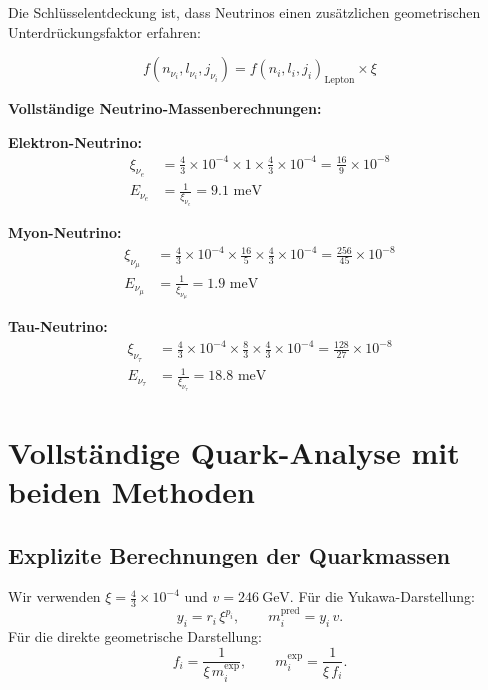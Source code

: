 	Die Schlüsselentdeckung ist, dass Neutrinos einen zusätzlichen geometrischen Unterdrückungsfaktor erfahren:
	
	\begin{equation}
		f(n_{\nu_i}, l_{\nu_i}, j_{\nu_i}) = f(n_i, l_i, j_i)_{\text{Lepton}} \times \xi
		\label{eq:neutrino_suppression}
	\end{equation}
	
	\textbf{Vollständige Neutrino-Massenberechnungen:}
	
	\textbf{Elektron-Neutrino:}
	\begin{align}
		\xi_{\nu_e} &= \frac{4}{3} \times 10^{-4} \times 1 \times \frac{4}{3} \times 10^{-4} = \frac{16}{9} \times 10^{-8} \\
		E_{\nu_e} &= \frac{1}{\xi_{\nu_e}} = 9.1 \text{ meV}
	\end{align}
	
	\textbf{Myon-Neutrino:}
	\begin{align}
		\xi_{\nu_\mu} &= \frac{4}{3} \times 10^{-4} \times \frac{16}{5} \times \frac{4}{3} \times 10^{-4} = \frac{256}{45} \times 10^{-8} \\
		E_{\nu_\mu} &= \frac{1}{\xi_{\nu_\mu}} = 1.9 \text{ meV}
	\end{align}
	
	\textbf{Tau-Neutrino:}
	\begin{align}
		\xi_{\nu_\tau} &= \frac{4}{3} \times 10^{-4} \times \frac{8}{3} \times \frac{4}{3} \times 10^{-4} = \frac{128}{27} \times 10^{-8} \\
		E_{\nu_\tau} &= \frac{1}{\xi_{\nu_\tau}} = 18.8 \text{ meV}
	\end{align}
	
	\section{Vollständige Quark-Analyse mit beiden Methoden}
	\label{sec:quark_analyse}
	
	\subsection{Explizite Berechnungen der Quarkmassen}
	\label{subsec:quark_calculations}
	
	Wir verwenden $\xi=\tfrac{4}{3}\times10^{-4}$ und $v=246\ \mathrm{GeV}$.
	Für die Yukawa-Darstellung:
	\[
	y_i = r_i\,\xi^{p_i},\qquad m_i^{\text{pred}}=y_i\,v.
	\]
	Für die direkte geometrische Darstellung:
	\[
	f_i=\frac{1}{\xi\, m_i^{\text{exp}}},\qquad m_i^{\text{exp}}=\frac{1}{\xi\, f_i}.
	\]
	
